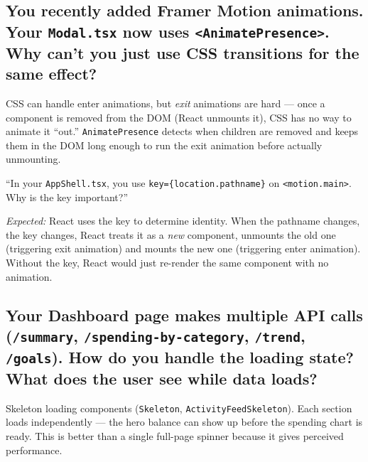 \documentclass[12pt, a4paper]{article}
\begin{document}
\subsection{You recently added Framer Motion animations. Your \texttt{Modal.tsx} now uses \texttt{<AnimatePresence>}. Why can't you just use CSS transitions for the same effect?}

\begin{listenfor}
CSS can handle enter animations, but \emph{exit} animations are hard — once a component is removed from the DOM (React unmounts it), CSS has no way to animate it ``out.'' \texttt{AnimatePresence} detects when children are removed and keeps them in the DOM long enough to run the exit animation before actually unmounting.
\end{listenfor}

\begin{followup}
``In your \texttt{AppShell.tsx}, you use \texttt{key=\{location.pathname\}} on \texttt{<motion.main>}. Why is the key important?''

\medskip
\emph{Expected:} React uses the key to determine identity. When the pathname changes, the key changes, React treats it as a \emph{new} component, unmounts the old one (triggering exit animation) and mounts the new one (triggering enter animation). Without the key, React would just re-render the same component with no animation.
\end{followup}

\subsection{Your Dashboard page makes multiple API calls (\texttt{/summary}, \texttt{/spending-by-category}, \texttt{/trend}, \texttt{/goals}). How do you handle the loading state? What does the user see while data loads?}

\begin{listenfor}
Skeleton loading components (\texttt{Skeleton}, \texttt{ActivityFeedSkeleton}). Each section loads independently — the hero balance can show up before the spending chart is ready. This is better than a single full-page spinner because it gives perceived performance.
\end{listenfor}

\newpage

\end{document}
